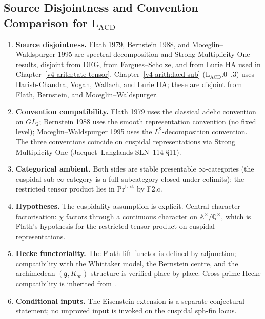 \subsection{Source Disjointness and Convention Comparison for \(\mathrm{L}_{\mathrm{ACD}}\)}

\begin{enumerate}
\item \textbf{Source disjointness.} Flath 1979, Bernstein 1988,
and Mo{\oe}glin--Waldspurger 1995 are spectral-decomposition and
Strong Multiplicity One results, disjoint from DEG, from
Fargues--Scholze, and from Lurie HA used in
Chapter~\ref{v4-arith:tate-tensor}.
Chapter~\ref{v4-arith:lacd-sub} (\(\mathrm{L}_{\mathrm{ACD}}\).0--.3)
uses Harish-Chandra, Vogan, Wallach, and Lurie HA; these are disjoint
from Flath, Bernstein, and Mo{\oe}glin--Waldspurger.

\item \textbf{Convention compatibility.} Flath 1979 uses the classical
adelic convention on \(GL_{2}\); Bernstein 1988 uses the smooth
representation convention (no fixed level); Mo{\oe}glin--Waldspurger
1995 uses the \(L^{2}\)-decomposition convention. The three conventions
coincide on cuspidal representations via Strong Multiplicity One
(Jacquet--Langlands SLN~114 \S 11).

\item \textbf{Categorical ambient.} Both sides are stable
presentable \(\infty\)-categories (the cuspidal sub-\(\infty\)-category
is a full subcategory closed under colimits); the restricted tensor
product lies in \(\mathrm{Pr}^{\mathrm{L,st}}\) by F2.c.

\item \textbf{Hypotheses.} The cuspidality assumption is explicit.
Central-character factorisation: \(\chi\) factors
through a continuous character on \(\mathbb{A}^{\times}/\mathbb{Q}^{\times}\),
which is Flath's hypothesis for the restricted tensor product on
cuspidal representations.

\item \textbf{Hecke functoriality.} The Flath-lift functor
is defined by adjunction; compatibility with the Whittaker model,
the Bernstein centre, and the archimedean
\((\mathfrak{g},K_{\infty})\)-structure is verified place-by-place.
Cross-prime Hecke compatibility is inherited from
.

\item \textbf{Conditional inputs.} The Eisenstein extension
 is a separate conjectural
statement; no unproved input is invoked on the cuspidal sph-fin locus.
\end{enumerate}

